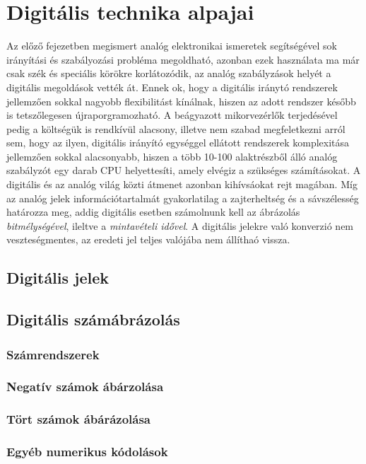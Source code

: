 \section{Digitális technika alpajai}
\vspace{5cm}

Az előző fejezetben megismert analóg elektronikai ismeretek segítségével sok irányítási és szabályozási probléma megoldható, azonban ezek használata ma már csak szék és speciális körökre korlátozódik, az analóg szabályzások helyét a digitális megoldások vették át. Ennek ok, hogy a digitális iránytó rendszerek jellemzően sokkal nagyobb flexibilitást kínálnak, hiszen az adott rendszer később is tetszőlegesen újraporgramozható. A beágyazott mikorvezérlők terjedésével pedig a költségük is rendkívül alacsony, illetve nem szabad megfeletkezni arról sem, hogy az ilyen, digitális irányító egységgel ellátott rendszerek komplexitása jellemzően sokkal alacsonyabb, hiszen a több 10-100 alaktrészből álló analóg szabályzót egy darab CPU helyettesíti, amely elvégiz a szükséges számításokat. A digitális és az analóg világ közti átmenet azonban kihívsáokat rejt magában. Míg az analóg jelek információtartalmát gyakorlatilag a zajterheltség és a sávszélesség határozza meg, addig digitális esetben számolnunk kell az ábrázolás \emph{bitmélységével}, ileltve a \emph{mintavételi idővel}. A digitális jelekre való konverzió nem veszteségmentes, az eredeti jel teljes valójába nem állíthaó vissza.

\subsection{Digitális jelek}

\subsection{Digitális számábrázolás}
\subsubsection{Számrendszerek}
\subsubsection{Negatív számok ábárzolása}
\subsubsection{Tört számok ábárázolása}
\subsubsection{Egyéb numerikus kódolások}
